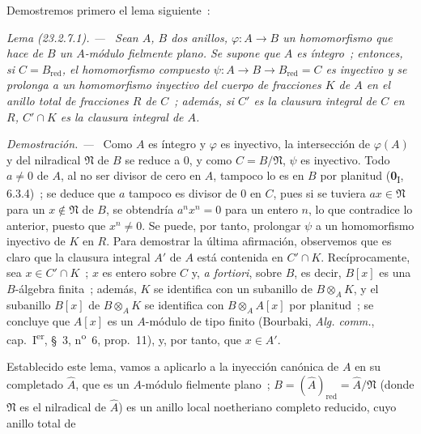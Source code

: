 \documentclass[10pt,oneside]{book}
\makeatletter
\newcommand{\setmanualcurrentlabel}[1]{\def\@currentlabel{#1}}
\newcommand{\oldpage}[2][]{%
  \setcounter{footnote}{0}%
  \marginpar{\scriptsize\textbf{#1}~|~#2}\ignorespaces}
\newenvironment{lemma}[1][]{%
  \setmanualcurrentlabel{#1}\par\medskip\noindent\itshape Lema (#1). ---\ }{\par}
\newenvironment{proof}{%
  \par\medskip\noindent\textit{Demostración. ---\ }}{\par}
\makeatother
\begin{document}
Demostremos primero el lema siguiente~:

\begin{lemma}[23.2.7.1]
\label{0.23.2.7.1-es}
Sean $A$, $B$ dos anillos, $\varphi:A\to B$ un homomorfismo que hace de $B$
un $A$-módulo fielmente plano. Se supone que $A$ es íntegro~; entonces, si
$C=B_{\mathrm{red}}$, el homomorfismo compuesto
$\psi:A\to B\to B_{\mathrm{red}}=C$ es inyectivo y se prolonga a un
homomorfismo inyectivo del cuerpo de fracciones $K$ de $A$ en el anillo total
de fracciones $R$ de $C$~; además, si $C'$ es la clausura integral de
$C$ en $R$, $C'\cap K$ es la clausura integral de $A$.
\end{lemma}

\begin{proof}
Como $A$ es íntegro y $\varphi$ es inyectivo, la intersección de $\varphi(A)$
y del nilradical $\mathfrak N$ de $B$ se reduce a $0$, y como
$C=B/\mathfrak N$, $\psi$ es inyectivo. Todo $a\neq0$ de $A$, al no ser
divisor de cero en $A$, tampoco lo es en $B$ por planitud
(\textbf{0}\textsubscript{I}, 6.3.4)~; se deduce que $a$ tampoco es divisor
de $0$ en $C$, pues si se tuviera $ax\in\mathfrak N$ para un
$x\notin\mathfrak N$ de $B$, se obtendría $a^nx^n=0$ para un entero $n$,
lo que contradice lo anterior, puesto que $x^n\neq0$. Se puede, por tanto, prolongar
$\psi$ a un homomorfismo inyectivo de $K$ en $R$. Para demostrar la última
afirmación, observemos que es claro que la clausura integral $A'$ de $A$ está
contenida en $C'\cap K$. Recíprocamente, sea $x\in C'\cap K$~; $x$ es
entero sobre $C$ y, \emph{a fortiori}, sobre $B$, es decir, $B[x]$ es una
$B$-álgebra finita~; además, $K$ se identifica con un subanillo de
$B\otimes_AK$, y el subanillo $B[x]$ de $B\otimes_AK$ se identifica con
$B\otimes_AA[x]$ por planitud~; se concluye que $A[x]$ es un $A$-módulo
de tipo finito (Bourbaki, \emph{Alg. comm.}, cap.~I\textsuperscript{er}, §~3,
n\textsuperscript{o}~6, prop.~11), y, por tanto, que $x\in A'$.
\end{proof}

Establecido este lema, vamos a aplicarlo a la inyección canónica de $A$
en su completado $\widehat A$, que es un $A$-módulo fielmente plano~;
$B=(\widehat A)_{\mathrm{red}}=\widehat A/\mathfrak N$ (donde $\mathfrak N$ es
el nilradical de $\widehat A$) es un anillo local noetheriano completo reducido,
cuyo anillo total de

\oldpage[0\textsubscript{IV-1}]{220}
\end{document}

